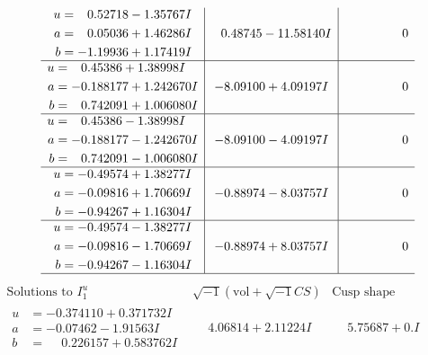 \documentclass[1p]{elsarticle_modified}
\theoremstyle{definition}
\newcommand{\I}{\sqrt{-1}}
\begin{document}
$$\begin{array}{c|c|c}
\begin{aligned}
u &= \phantom{-}0.52718 - 1.35767 I \\
a &= \phantom{-}0.05036 + 1.46286 I \\
b &= -1.19936 + 1.17419 I\end{aligned}
 & \phantom{-}0.48745 - 11.58140 I & \phantom{-0.000000 } 0 \\ \hline\begin{aligned}
u &= \phantom{-}0.45386 + 1.38998 I \\
a &= -0.188177 + 1.242670 I \\
b &= \phantom{-}0.742091 + 1.006080 I\end{aligned}
 & -8.09100 + 4.09197 I & \phantom{-0.000000 } 0 \\ \hline\begin{aligned}
u &= \phantom{-}0.45386 - 1.38998 I \\
a &= -0.188177 - 1.242670 I \\
b &= \phantom{-}0.742091 - 1.006080 I\end{aligned}
 & -8.09100 - 4.09197 I & \phantom{-0.000000 } 0 \\ \hline\begin{aligned}
u &= -0.49574 + 1.38277 I \\
a &= -0.09816 + 1.70669 I \\
b &= -0.94267 + 1.16304 I\end{aligned}
 & -0.88974 - 8.03757 I & \phantom{-0.000000 } 0 \\ \hline\begin{aligned}
u &= -0.49574 - 1.38277 I \\
a &= -0.09816 - 1.70669 I \\
b &= -0.94267 - 1.16304 I\end{aligned}
 & -0.88974 + 8.03757 I & \phantom{-0.000000 } 0\\
 \hline 
 \end{array}$$\newpage$$\begin{array}{c|c|c}  
\text{Solutions to }I^u_{1}& \I (\text{vol} + \sqrt{-1}CS) & \text{Cusp shape}\\
 \hline 
\begin{aligned}
u &= -0.374110 + 0.371732 I \\
a &= -0.07462 - 1.91563 I \\
b &= \phantom{-}0.226157 + 0.583762 I\end{aligned}
 & \phantom{-}4.06814 + 2.11224 I & \phantom{-}5.75687 + 0. I\phantom{ +0.000000I} \\ \hline\begin{aligned}

\end{aligned}
\end{array}$$
\end{document}
